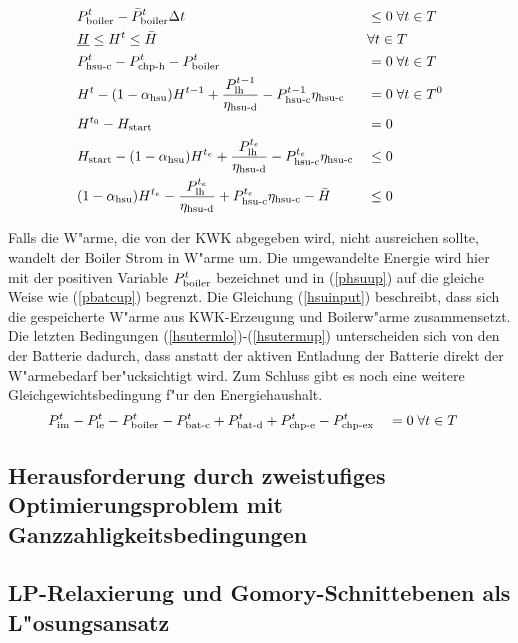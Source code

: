 \begin{align}
& P^t_{\text{boiler}} - \bar P^t_{\text{boiler}} \Delta t && \leq 0 \; \forall	 t \in T \label{phsuup} \\
& \underline{H} \leq H^t \leq \bar H && \forall t \in T \label{Hbd}\\
& P^t_{\text{hsu-c}} - P^t_{\text{chp-h}} -P^t_{\text{boiler}} &&= 0 \; \forall t \in T \label{hsuinput}\\
& H^t - (1-\alpha_{\text{hsu}}) H^{t-1} + \frac{P^{t-1}_{\text{lh}}}{\eta_{\text{hsu-d}}} - P^{t-1}_{\text{hsu-c}} \eta_{\text{hsu-c}} &&= 0 \; \forall t \in T^0 \label{hsubal} \\
& H^{t_0} - H_\text{start} &&= 0 \label{inithsu}\\
& H_\text{start} - (1-\alpha_{\text{hsu}}) H^{t_e} + \frac{P^{t_e}_{\text{lh}}}{\eta_{\text{hsu-d}}} - P^{t_e}_{\text{hsu-c}} \eta_{\text{hsu-c}}  &&\leq 0 \label{hsutermlo}\\
& (1-\alpha_{\text{hsu}}) H^{t_e} - \frac{P^{t_e}_{\text{lh}}}{\eta_{\text{hsu-d}}} + P^{t_e}_{\text{hsu-c}} \eta_{\text{hsu-c}} - \bar H  &&\leq 0 \label{hsutermup} 
\end{align}

Falls die W"arme, die von der KWK abgegeben wird, nicht ausreichen sollte, wandelt der Boiler Strom in W"arme um. Die umgewandelte Energie wird hier mit der positiven Variable $P^t_{\text{boiler}}$ bezeichnet und in (\ref{phsuup}) auf die gleiche Weise wie (\ref{pbatcup}) begrenzt. Die Gleichung (\ref{hsuinput}) beschreibt, dass sich die gespeicherte W"arme aus KWK-Erzeugung und Boilerw"arme zusammensetzt. Die letzten Bedingungen (\ref{hsutermlo})-(\ref{hsutermup}) unterscheiden sich von den der Batterie dadurch, dass anstatt der aktiven Entladung der Batterie direkt der W"armebedarf ber"ucksichtigt wird. 
Zum Schluss gibt es noch eine weitere Gleichgewichtsbedingung f"ur den Energiehaushalt.
\begin{align}
& P^t_{\text{im}} - P^t_{\text{le}} - P^t_{\text{boiler}} - P^t_{\text{bat-c}} + P^t_{\text{bat-d}} + P^t_{\text{chp-e}} - P^t_{\text{chp-ex}} &&= 0 \; \forall t \in T \label{elecbal}
\end{align}



\subsection{Herausforderung durch zweistufiges Optimierungsproblem mit Ganzzahligkeitsbedingungen }

\subsection{LP-Relaxierung und Gomory-Schnittebenen als L"osungsansatz}
